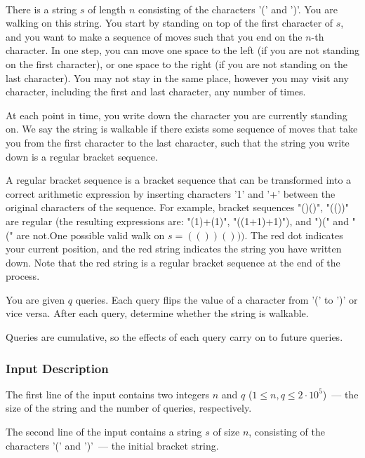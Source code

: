 \documentclass{article}
\begin{document}
\paragraph{}There is a string $s$ of length $n$ consisting of the characters '(' and ')'. You are walking on this string. You start by standing on top of the first character of $s$, and you want to make a sequence of moves such that you end on the $n$-th character. In one step, you can move one space to the left (if you are not standing on the first character), or one space to the right (if you are not standing on the last character). You may not stay in the same place, however you may visit any character, including the first and last character, any number of times.

At each point in time, you write down the character you are currently standing on. We say the string is walkable if there exists some sequence of moves that take you from the first character to the last character, such that the string you write down is a regular bracket sequence.

A regular bracket sequence is a bracket sequence that can be transformed into a correct arithmetic expression by inserting characters '1' and '+' between the original characters of the sequence. For example, bracket sequences "()()", "(())" are regular (the resulting expressions are: "(1)+(1)", "((1+1)+1)"), and ")(" and "(" are not.One possible valid walk on $s=\mathtt{(())()))}$. The red dot indicates your current position, and the red string indicates the string you have written down. Note that the red string is a regular bracket sequence at the end of the process.

You are given $q$ queries. Each query flips the value of a character from '(' to ')' or vice versa. After each query, determine whether the string is walkable.

Queries are cumulative, so the effects of each query carry on to future queries.
\paragraph{}
\subsubsection*{Input Description}The first line of the input contains two integers $n$ and $q$ ($1 \le n, q \le 2\cdot 10^5$) — the size of the string and the number of queries, respectively.

The second line of the input contains a string $s$ of size $n$, consisting of the characters '(' and ')' — the initial bracket string.
\end{document}
